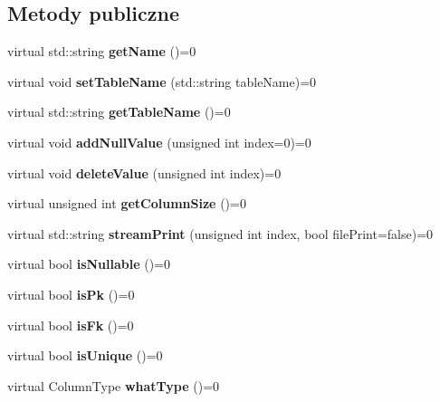 \subsection*{Metody publiczne}
\begin{DoxyCompactItemize}
\item 
\mbox{\label{class_column_handler_a020bbf00c5b3ece65cb6122b1f17c749}} 
virtual std\+::string {\bfseries get\+Name} ()=0
\item 
\mbox{\label{class_column_handler_a1b9efa4e5fcc8b788109772e59173a2a}} 
virtual void {\bfseries set\+Table\+Name} (std\+::string table\+Name)=0
\item 
\mbox{\label{class_column_handler_a8dcfcbed92a3e1ed4d91ff88e5fcae6d}} 
virtual std\+::string {\bfseries get\+Table\+Name} ()=0
\item 
\mbox{\label{class_column_handler_a3d2b864155ffb3daeba5337654a42a94}} 
virtual void {\bfseries add\+Null\+Value} (unsigned int index=0)=0
\item 
\mbox{\label{class_column_handler_aefd69e41261e8c0aa953c9f915762b80}} 
virtual void {\bfseries delete\+Value} (unsigned int index)=0
\item 
\mbox{\label{class_column_handler_a184549518f6c45829b4b413d3b07055f}} 
virtual unsigned int {\bfseries get\+Column\+Size} ()=0
\item 
\mbox{\label{class_column_handler_ab79c65f0e167f6c640f7d4daf92e9593}} 
virtual std\+::string {\bfseries stream\+Print} (unsigned int index, bool file\+Print=false)=0
\item 
\mbox{\label{class_column_handler_a06482951220e9871cd7d51fcfd1d3729}} 
virtual bool {\bfseries is\+Nullable} ()=0
\item 
\mbox{\label{class_column_handler_af296a21afca765c83e508038ba4bf070}} 
virtual bool {\bfseries is\+Pk} ()=0
\item 
\mbox{\label{class_column_handler_a22e64016cb2e0b35094d192fbab0d416}} 
virtual bool {\bfseries is\+Fk} ()=0
\item 
\mbox{\label{class_column_handler_a375114cf104e5bd8147d66f30613ed6c}} 
virtual bool {\bfseries is\+Unique} ()=0
\item 
\mbox{\label{class_column_handler_a353fdaaa60e433b2dacb87144ad7f0dd}} 
virtual Column\+Type {\bfseries what\+Type} ()=0
\end{DoxyCompactItemize}


